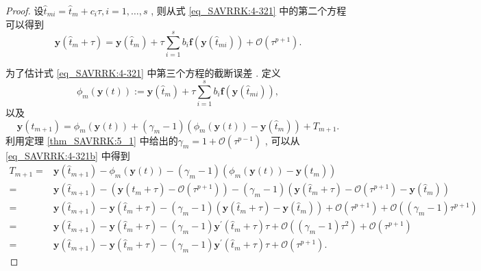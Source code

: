 \begin{proof}
设$\hat{t}_{m i}=\hat{t}_m+c_i\tau , i=1 , \ldots , s$ , 
则从式 \eqref{eq_SAVRRK:4-321} 中的第二个方程可以得到
\begin{equation}\label{eq_SAVRRK:4-321b}
\bm{y}\left(\hat{t}_m+\tau\right)=\bm{y}\left(\hat{t}_m\right)+\tau \sum_{i=1}^s b_i \bm{f}\left(\bm{y}\left(\hat{t}_{m i}\right)\right)+\mathcal{O}\left(\tau^{p+1}\right) . 
\end{equation}

为了估计式 \eqref{eq_SAVRRK:4-321} 中第三个方程的截断误差 . 
定义
$$\phi_m(\bm{y}(t)):=\bm{y}\left(\hat{t}_m\right)+\tau \sum\limits_{i=1}^s b_i \bm{f}\left(\bm{y}\left(\hat{t}_{m i}\right)\right) , $$
以及
\begin{equation}
\bm{y}\left(\hat{t}_{m+1}\right)=\phi_m(\bm{y}(t))+\left(\gamma_m-1\right)\left(\phi_m(\bm{y}(t))-\bm{y}\left(\hat{t}_m\right)\right)+T_{m+1} . 
\end{equation}
利用定理 \ref{thm_SAVRRK:5_1} 中给出的$\gamma_m=1+\mathcal{O}\left(\tau^{p-1}\right)$ , 可以从 \eqref{eq_SAVRRK:4-321b} 中得到
\begin{equation}
\begin{aligned}
T_{m+1}= & \bm{y}\left(\hat{t}_{m+1}\right)\!-\!\phi_m(\bm{y}(t))\!-\!\left(\gamma_m-1\right)\left(\phi_m(\bm{y}(t))\!-\!\bm{y}\left(\hat{t}_m\right)\right) \\
= & \bm{y}\left(\hat{t}_{m+1}\right)\!-\!\left(\bm{y}\left(\hat{t}_m\!+\!\tau\right)\!-\!\mathcal{O}(\tau^{p+1})\right)\!-\!\left(\gamma_m-1\right)\left(\bm{y}\left(\hat{t}_m+\tau\right)\!-\!\mathcal{O}(\tau^{p+1})\!-\!\bm{y}\left(\hat{t}_m\right)\right) \\
= & \bm{y}\left(\hat{t}_{m+1}\right)\!-\!\bm{y}\left(\hat{t}_m\!+\!\tau\right)\!-\!\left(\gamma_m-1\right)\left(\bm{y}\left(\hat{t}_m+\tau\right)\!-\!\bm{y}\left(\hat{t}_m\right)\right)\!+\!\mathcal{O}(\tau^{p+1})\!+\!\mathcal{O}((\gamma_m-1) \tau^{p+1}) \\
= & \bm{y}\left(\hat{t}_{m+1}\right)\!-\!\bm{y}\left(\hat{t}_m\!+\!\tau\right)\!-\!\left(\gamma_m-1\right) \bm{y}^{\prime}\left(\hat{t}_m+\tau\right) \tau\!+\!\mathcal{O}((\gamma_m-1) \tau^2)\!+\!\mathcal{O}(\tau^{p+1}) \\
= & \bm{y}\left(\hat{t}_{m+1}\right)\!-\!\bm{y}\left(\hat{t}_m\!+\!\tau\right)\!-\!\left(\gamma_m-1\right) \bm{y}^{\prime}\left(\hat{t}_m+\tau\right) \tau\!+\!\mathcal{O}(\tau^{p+1}) . 
\end{aligned}
\end{equation}


\end{proof}
